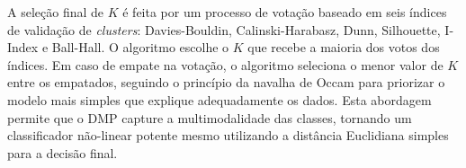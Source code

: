 A seleção final de $K$ é feita por um processo de votação baseado em seis índices de validação de \textit{clusters}: Davies-Bouldin, Calinski-Harabasz, Dunn, Silhouette, I-Index e Ball-Hall. O algoritmo escolhe o $K$ que recebe a maioria dos votos dos índices. Em caso de empate na votação, o algoritmo seleciona o menor valor de $K$ entre os empatados, seguindo o princípio da navalha de Occam para priorizar o modelo mais simples que explique adequadamente os dados. Esta abordagem permite que o DMP capture a multimodalidade das classes, tornando um classificador não-linear potente mesmo utilizando a distância Euclidiana simples para a decisão final.
